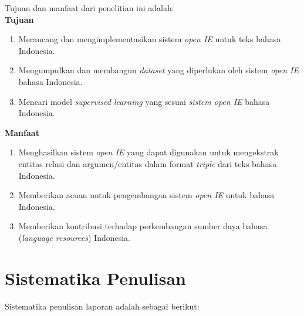 Tujuan dan manfaat dari penelitian ini adalah:\\

\textbf{Tujuan}

\begin{enumerate}
\item Merancang dan mengimplementasikan sistem \textit{open IE} untuk teks bahasa Indonesia.
\item Mengumpulkan dan membangun \textit{dataset} yang diperlukan oleh sistem \textit{open IE} bahasa Indonesia.
\item Mencari model \textit{supervised learning} yang sesuai \textit{sistem open IE} bahasa Indonesia.
\end{enumerate}

\textbf{Manfaat}

\begin{enumerate}
\item Menghasilkan sistem \textit{open IE} yang dapat digunakan untuk mengekstrak entitas relasi dan argumen/entitas dalam format \textit{triple} dari teks bahasa Indonesia.

\item Memberikan acuan untuk pengembangan sistem \textit{open IE} untuk bahasa Indonesia.

\item Memberikan kontribusi terhadap perkembangan sumber daya bahasa (\textit{language resources}) Indonesia.
\end{enumerate}

\section{Sistematika Penulisan}
Sistematika penulisan laporan adalah sebagai berikut:


